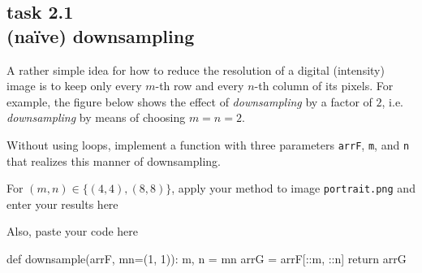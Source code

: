 
\subsection*{task 2.1 \\[1ex] (na\"ive) downsampling}

A rather simple idea for how to reduce the resolution of a digital (intensity) image is to keep only every $m$-th row and every $n$-th column of its pixels. For example, the figure below shows the effect of \emph{downsampling} by a factor of $2$, i.e. \emph{downsampling} by means of choosing $m = n = 2$.

Without using  loops, implement a function  with three parameters \texttt{arrF}, \texttt{m}, and \texttt{n} that realizes this manner of downsampling.

For $(m,n) \in \bigl\{ (4,4), (8,8) \bigr\}$, apply your method to image \texttt{portrait.png} and enter your results here
\begin{figure}[h!]
 \hfill
{} \hfill
{} \hfill
{}
\end{figure}



\vspace{2cm}
Also, paste your code here 
\begin{python}
def downsample(arrF, mn=(1, 1)):
    m, n = mn
    arrG = arrF[::m, ::n]
    return arrG
\end{python}
